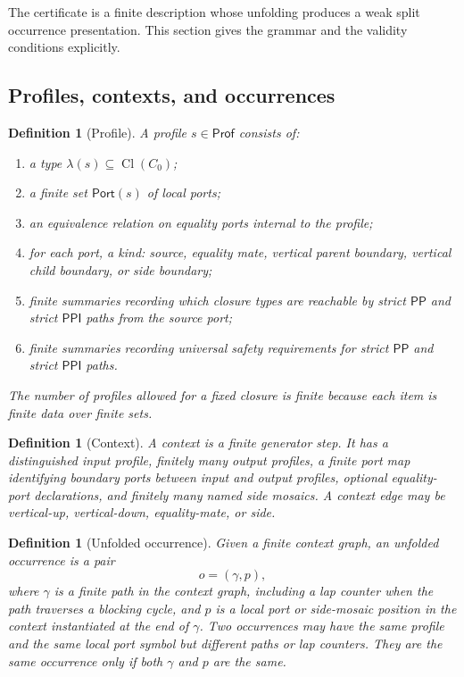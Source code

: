 \documentclass[11pt]{article}
\newtheorem{definition}[theorem]{Definition}
\newcommand{\PP}{\mathsf{PP}}
\newcommand{\PPI}{\mathsf{PPI}}
\newcommand{\Cl}{\operatorname{Cl}}
\newcommand{\Prof}{\mathsf{Prof}}
\newcommand{\Port}{\mathsf{Port}}
\begin{document}
The certificate is a finite description whose unfolding produces a weak split occurrence presentation.  This section gives the grammar and the validity conditions explicitly.

\subsection{Profiles, contexts, and occurrences}

\begin{definition}[Profile]\label{def:profile}
A profile $s\in\Prof$ consists of:
\begin{enumerate}[label=(P\arabic*)]
\item a type $\lambda(s)\subseteq\Cl(C_0)$;
\item a finite set $\Port(s)$ of local ports;
\item an equivalence relation on equality ports internal to the profile;
\item for each port, a kind: source, equality mate, vertical parent boundary, vertical child boundary, or side boundary;
\item finite summaries recording which closure types are reachable by strict $\PP$ and strict $\PPI$ paths from the source port;
\item finite summaries recording universal safety requirements for strict $\PP$ and strict $\PPI$ paths.
\end{enumerate}
The number of profiles allowed for a fixed closure is finite because each item is finite data over finite sets.
\end{definition}

\begin{definition}[Context]\label{def:context}
A context is a finite generator step.  It has a distinguished input profile, finitely many output profiles, a finite port map identifying boundary ports between input and output profiles, optional equality-port declarations, and finitely many named side mosaics.  A context edge may be vertical-up, vertical-down, equality-mate, or side.
\end{definition}

\begin{definition}[Unfolded occurrence]\label{def:unfolded-occ}
Given a finite context graph, an unfolded occurrence is a pair
\[
   o=(\gamma,p),
\]
where $\gamma$ is a finite path in the context graph, including a lap counter when the path traverses a blocking cycle, and $p$ is a local port or side-mosaic position in the context instantiated at the end of $\gamma$.  Two occurrences may have the same profile and the same local port symbol but different paths or lap counters.  They are the same occurrence only if both $\gamma$ and $p$ are the same.
\end{definition}
\end{document}
